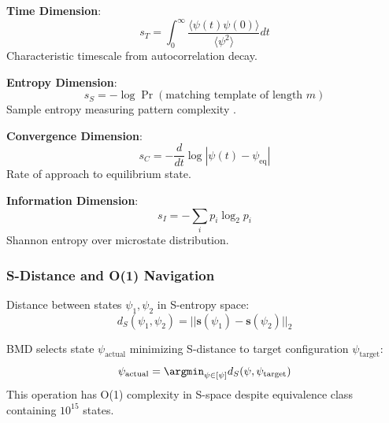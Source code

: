 \documentclass[11pt,onecolumn]{article}
\begin{document}
\textbf{Time Dimension}:
\begin{equation}
s_T = \int_0^{\infty} \frac{\langle \psi(t) \psi(0) \rangle}{\langle \psi^2 \rangle} dt
\end{equation}
Characteristic timescale from autocorrelation decay.

\textbf{Entropy Dimension}:
\begin{equation}
s_S = -\log \Pr(\text{matching template of length } m)
\end{equation}
Sample entropy measuring pattern complexity \citep{richman2000physiological}.

\textbf{Convergence Dimension}:
\begin{equation}
s_C = -\frac{d}{dt}\log|\psi(t) - \psi_{\text{eq}}|
\end{equation}
Rate of approach to equilibrium state.

\textbf{Information Dimension}:
\begin{equation}
s_I = -\sum_i p_i \log_2 p_i
\end{equation}
Shannon entropy over microstate distribution.

\subsubsection{S-Distance and O(1) Navigation}

\begin{definition}[S-Distance]
Distance between states $\psi_1, \psi_2$ in S-entropy space:
\begin{equation}
d_S(\psi_1, \psi_2) = ||\mathbf{s}(\psi_1) - \mathbf{s}(\psi_2)||_2
\end{equation}
\end{definition}

\begin{theorem}
BMD selects state $\psi_{\text{actual}}$ minimizing S-distance to target configuration $\psi_{\text{target}}$:
\begin{equation}
\psi_{\text{actual}} = \argmin_{\psi \in [\psi]} d_S(\psi, \psi_{\text{target}})
\end{equation}
This operation has O(1) complexity in S-space despite equivalence class containing $10^{15}$ states.
\end{theorem}
\end{document}
